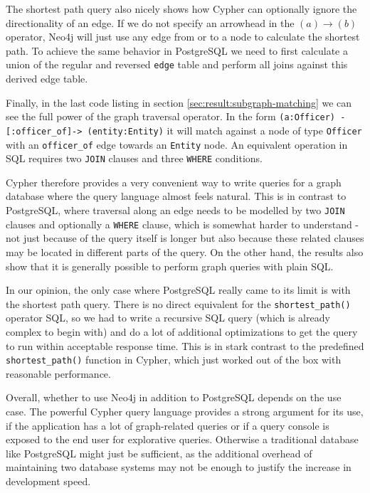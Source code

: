 \documentclass[11pt, a4paper,oneside,chapterprefix=false]{scrbook}
\begin{document}
The shortest path query also nicely shows how Cypher can optionally ignore the directionality of an edge.
If we do not specify an arrowhead in the $(a) \rightarrow (b)$ operator, Neo4j will just use any edge from or to a node to calculate the shortest path.
To achieve the same behavior in PostgreSQL we need to first calculate a union of the regular and reversed \lstinline{edge} table and perform all joins against this derived edge table.

Finally, in the last code listing in section \ref{sec:result:subgraph-matching} we can see the full power of the graph traversal operator. In the form \lstinline{(a:Officer) -[:officer_of]-> (entity:Entity)} it will match against a node of type \lstinline{Officer} with an \lstinline{officer_of} edge towards an \lstinline{Entity} node. An equivalent operation in SQL requires two \lstinline{JOIN} clauses and three \lstinline{WHERE} conditions.

Cypher therefore provides a very convenient way to write queries for a graph database where the query language almost feels natural.
This is in contrast to PostgreSQL, where traversal along an edge needs to be modelled by two \lstinline{JOIN} clauses and optionally a \lstinline{WHERE} clause, which is somewhat harder to understand - not just because of the query itself is longer but also because these related clauses may be located in different parts of the query.
On the other hand, the results also show that it is generally possible to perform graph queries with plain SQL.

In our opinion, the only case where PostgreSQL really came to its limit is with the shortest path query.
There is no direct equivalent for the \lstinline{shortest_path()} operator SQL, so we had to write a recursive SQL query (which is already complex to begin with) and do a lot of additional optimizations to get the query to run within acceptable response time.
This is in stark contrast to the predefined \lstinline{shortest_path()} function in Cypher, which just worked out of the box with reasonable performance.

Overall, whether to use Neo4j in addition to PostgreSQL depends on the use case.
The powerful Cypher query language provides a strong argument for its use, if the application has a lot of graph-related  queries or if a query console is exposed to the end user for explorative queries.
Otherwise a traditional database like PostgreSQL might just be sufficient, as the additional overhead of maintaining two database systems may not be enough to justify the increase in development speed.
\end{document}
